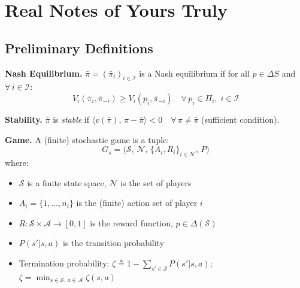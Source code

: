 \documentclass[a4paper,oneside,11pt]{report}
\begin{document}

\dissertationtitlepage


\begin{dissertationsummary}

\end{dissertationsummary}


\dissertationtableofcontents


\chapter{Real Notes of Yours Truly}


\section{Preliminary Definitions}

\textbf{Nash Equilibrium.} $\bar{\pi} = (\bar{\pi}_i)_{i \in \mathcal{I}}$ is a Nash equilibrium if for all $p \in \Delta S$ and $\forall\, i \in \mathcal{I}$:
\[
  V_i(\bar{\pi}_i, \bar{\pi}_{-i}) \geq V_i(p_i, \bar{\pi}_{-i}) \quad \forall\, p_i \in \Pi_i,\; i \in \mathcal{I}
\]

\textbf{Stability.} $\bar{\pi}$ is \textit{stable} if $\langle v(\bar{\pi}),\, \pi - \bar{\pi} \rangle < 0 \quad \forall\, \pi \neq \bar{\pi}$ (sufficient condition).

\textbf{Game.} A (finite) stochastic game is a tuple:
\[
  G_s = \bigl(\mathcal{S},\, \mathcal{N},\, \{A_i, R_i\}_{i \in \mathcal{N}},\, P \bigr)
\]
where:
\begin{itemize}
  \item $\mathcal{S}$ is a finite state space, $\mathcal{N}$ is the set of players
  \item $A_i = \{1, \ldots, n_i\}$ is the (finite) action set of player $i$
  \item $R: \mathcal{S} \times \mathcal{A} \to [0,1]$ is the reward function, $p \in \Delta(\mathcal{S})$
  \item $P(s' | s, a)$ is the transition probability
  \item Termination probability: $\zeta \triangleq 1 - \sum_{s' \in \mathcal{S}} P(s' | s, a)$;\quad $\zeta = \min_{s \in \mathcal{S},\, a \in \mathcal{A}} \zeta(s,a)$
\end{itemize}
\end{document}
